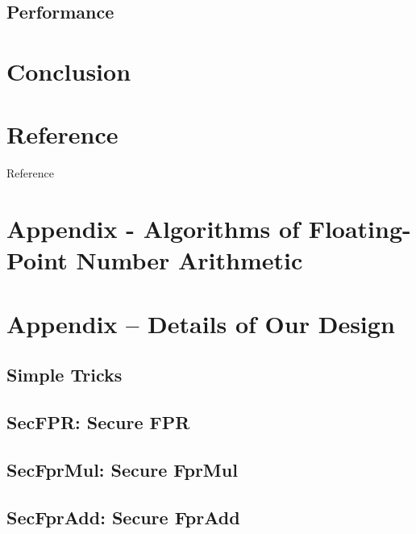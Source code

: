 \subsection{Performance}




\section{Conclusion}




\section*{Reference}

\begin{frame}[allowframebreaks]{Reference}


\printbibliography[title=Reference]

\end{frame}

\appendix
\backupbegin

\section{Appendix - Algorithms of Floating-Point Number Arithmetic}
\label{sec:appendix-fpu}


\section{Appendix – Details of Our Design}
\label{sec:appendix}
\hypertarget{sec:appendix}{}

\ifhandout
\else
\subsection{Simple Tricks}

\fi

\subsection{SecFPR: Secure FPR}


\subsection{SecFprMul: Secure FprMul}


\subsection{SecFprAdd: Secure FprAdd}


\backupend


